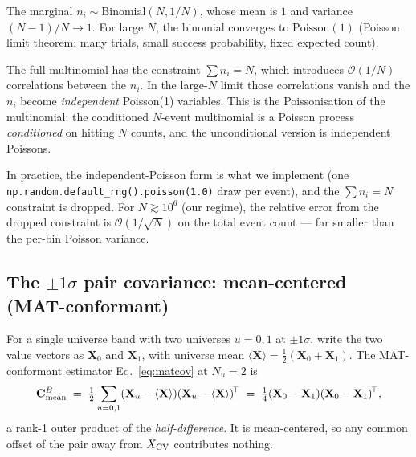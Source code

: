 The marginal $n_{i}\sim\mathrm{Binomial}(N,1/N)$, whose mean is $1$
and variance $(N-1)/N \to 1$. For large $N$, the binomial converges to
$\mathrm{Poisson}(1)$ (Poisson limit theorem: many trials, small
success probability, fixed expected count).

The full multinomial has the constraint $\sum n_{i}=N$, which
introduces $\mathcal{O}(1/N)$ correlations between the $n_{i}$. In the
large-$N$ limit those correlations vanish and the $n_{i}$ become
\emph{independent} Poisson(1) variables. This is the Poissonisation
of the multinomial: the conditioned $N$-event multinomial is a
Poisson process \emph{conditioned} on hitting $N$ counts, and the
unconditional version is independent Poissons.

In practice, the independent-Poisson form is what we implement (one
\texttt{np.random.default\_rng().poisson(1.0)} draw per event), and
the $\sum n_{i}=N$ constraint is dropped. For $N \gtrsim 10^{6}$
(our regime), the relative error from the dropped constraint is
$\mathcal{O}(1/\sqrt{N})$ on the total event count --- far smaller
than the per-bin Poisson variance.

\subsection{The $\pm 1\sigma$ pair covariance: mean-centered (MAT-conformant)}
\label{app:pair}

For a single universe band with two universes $u=0,1$ at $\pm 1\sigma$,
write the two value vectors as $\mathbf{X}_{0}$ and $\mathbf{X}_{1}$,
with universe mean $\langle\mathbf{X}\rangle = \tfrac12(\mathbf{X}_{0}
+\mathbf{X}_{1})$. The MAT-conformant estimator
Eq.~\eqref{eq:matcov} at $N_{u}=2$ is
\begin{equation}
\mathbf{C}^{B}_{\text{mean}}
\;=\;
\tfrac12\sum_{u=0,1}(\mathbf{X}_{u}-\langle\mathbf{X}\rangle)(\mathbf{X}_{u}-\langle\mathbf{X}\rangle)^{\!\top}
\;=\;
\tfrac14(\mathbf{X}_{0}-\mathbf{X}_{1})(\mathbf{X}_{0}-\mathbf{X}_{1})^{\!\top},
\end{equation}
a rank-1 outer product of the \emph{half-difference}. It is mean-centered,
so any common offset of the pair away from $X_{\text{CV}}$ contributes
nothing.

